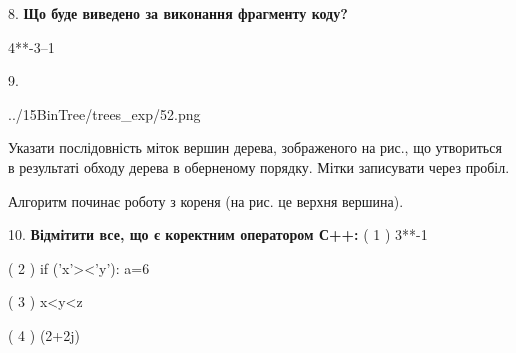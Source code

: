 \documentclass[11pt]{article}
\begin{document}
8. \textbf{Що буде виведено за виконання фрагменту коду?}

4**-3--1
\vspace{5mm}

9. 

\begin{center}
	{../15BinTree/trees_exp/52.png}
\end{center}
Указати послідовність міток вершин дерева, зображеного на рис., що утвориться в результаті обходу дерева в оберненому порядку. Мітки записувати через пробіл.\par Алгоритм починає роботу з кореня (на рис. це верхня вершина).
\vspace{5mm}

10. %
\textbf{Відмітити все, що є коректним оператором С++:}
( 1 ) 3**-1

( 2 ) if ('x'><'y'): a=6

( 3 ) x<y<z

( 4 ) (2+2j)%
\vspace{5mm}

\newpage
\end{document}

